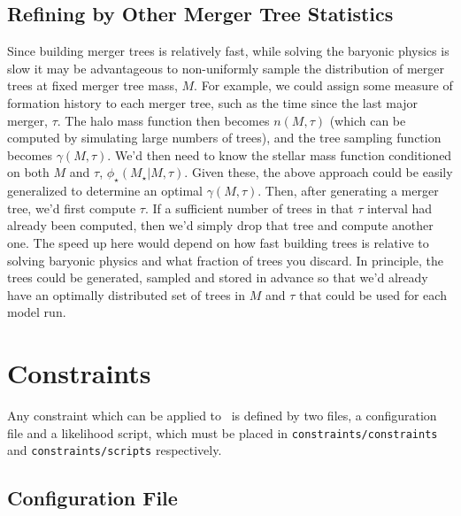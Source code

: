 \subsection{Refining by Other Merger Tree Statistics}

Since building merger trees is relatively fast, while solving the baryonic physics is slow it may be advantageous to  non-uniformly sample the distribution of merger trees at fixed merger tree mass, $M$. For example, we could assign some measure of formation history to each merger tree, such as the time since the last major merger, $\tau$. The halo mass function then becomes $n(M,\tau)$ (which can be computed by simulating large numbers of trees), and the tree sampling function becomes $\gamma(M,\tau)$. We'd then need to know the stellar mass function conditioned on both $M$ and $\tau$, $\phi_\star(M_\star|M,\tau)$. Given these, the above approach could be easily generalized to determine an optimal $\gamma(M,\tau)$. Then, after generating a merger tree, we'd first compute $\tau$. If a sufficient number of trees in that $\tau$ interval had already been computed, then we'd simply drop that tree and compute another one. The speed up here would depend on how fast building trees is relative to solving baryonic physics and what fraction of trees you discard. In principle, the trees could be generated, sampled and stored in advance so that we'd already have an optimally distributed set of trees in $M$ and $\tau$ that could be used for each model run.

\section{Constraints}\label{sec:ConstraintScripts}

Any constraint which can be applied to \glc\ is defined by two files, a configuration file and a likelihood script, which must be placed in {\tt constraints/constraints} and {\tt constraints/scripts} respectively. 

\subsection{Configuration File}\label{sec:ConstraintConfigFiles}

